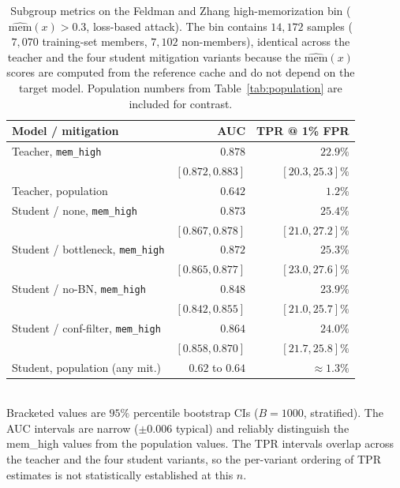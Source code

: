 \documentclass[conference]{IEEEtran}
\begin{document}
\begin{table}[t]
\caption{Subgroup metrics on the Feldman and Zhang high-memorization bin ($\widehat{\mathrm{mem}}(x) > 0.3$, loss-based attack). The bin contains $14{,}172$ samples ($7{,}070$ training-set members, $7{,}102$ non-members), identical across the teacher and the four student mitigation variants because the $\widehat{\mathrm{mem}}(x)$ scores are computed from the reference cache and do not depend on the target model. Population numbers from Table~\ref{tab:population} are included for contrast.}
\label{tab:fz}
\centering
\footnotesize
\begin{tabular}{lrr}
\toprule
Model / mitigation & AUC & TPR @ 1\% FPR \\
\midrule
Teacher, \texttt{mem\_high} & $0.878$ & $22.9\%$ \\
                            & {\scriptsize $[0.872, 0.883]$} & {\scriptsize $[20.3, 25.3]\%$} \\
Teacher, population         & $0.642$ & $1.2\%$ \\
\midrule
Student / none, \texttt{mem\_high}        & $0.873$ & $25.4\%$ \\
                                          & {\scriptsize $[0.867, 0.878]$} & {\scriptsize $[21.0, 27.2]\%$} \\
Student / bottleneck, \texttt{mem\_high}  & $0.872$ & $25.3\%$ \\
                                          & {\scriptsize $[0.865, 0.877]$} & {\scriptsize $[23.0, 27.6]\%$} \\
Student / no-BN, \texttt{mem\_high}       & $0.848$ & $23.9\%$ \\
                                          & {\scriptsize $[0.842, 0.855]$} & {\scriptsize $[21.0, 25.7]\%$} \\
Student / conf-filter, \texttt{mem\_high} & $0.864$ & $24.0\%$ \\
                                          & {\scriptsize $[0.858, 0.870]$} & {\scriptsize $[21.7, 25.8]\%$} \\
Student, population (any mit.)            & $0.62$ to $0.64$ & $\approx 1.3\%$ \\
\bottomrule
\end{tabular}
\\[2pt]
{\footnotesize Bracketed values are $95\%$ percentile bootstrap CIs ($B = 1000$, stratified). The AUC intervals are narrow ($\pm 0.006$ typical) and reliably distinguish the mem\_high values from the population values. The TPR intervals overlap across the teacher and the four student variants, so the per-variant ordering of TPR estimates is not statistically established at this $n$.}
\end{table}
\end{document}
